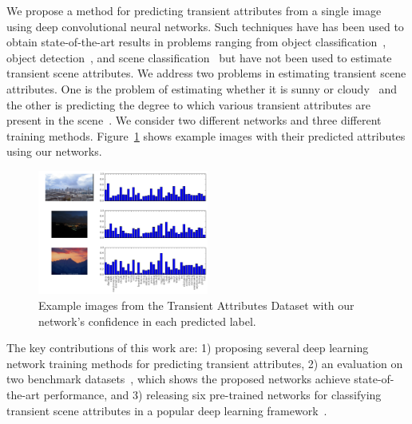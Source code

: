 \documentclass[10pt,twocolumn,letterpaper]{article}
\newcommand{\figref}[1]{Figure~\ref{fig:#1}}
\begin{document}

We propose a method for predicting transient attributes from a single image
using deep convolutional neural networks. Such techniques have has been used to
obtain state-of-the-art results in problems ranging from object
classification~\cite{krizhevsky2012imagenet}, object
detection~\cite{girshick2013rich}, and scene
classification~\cite{zhou2014places} but have not been used to estimate
transient scene attributes. We address two problems in estimating transient
scene attributes. One is the problem of estimating whether it is sunny or
cloudy~\cite{lutwoclass} and the other is predicting the degree to which
various transient attributes are present in the scene~\cite{Laffont14}. We
consider two different networks and three different training methods.
\figref{results} shows example images with their predicted attributes using our
networks.


\begin{figure}
	\centering
		\includegraphics[width=0.5\textwidth]{figs/bars.pdf}
		\caption{Example images from the Transient Attributes Dataset
      with our network's confidence in each predicted label.}
    \label{fig:results}
\end{figure}


The key contributions of this work are: 1) proposing several deep learning
network training methods for predicting transient attributes, 2) an evaluation
on two benchmark datasets~\cite{lutwoclass,Laffont14}, which shows the proposed
networks achieve state-of-the-art performance, and 3) releasing six pre-trained
networks for classifying transient scene attributes in a popular deep learning
framework~\cite{caffe14}. 
\end{document}
